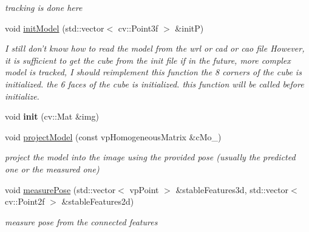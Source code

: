 \begin{DoxyCompactItemize}
\begin{DoxyCompactList}\small\item\em tracking is done here \end{DoxyCompactList}\item 
void \hyperlink{classkltFbTracker_aa830b7fcfceaa9bfccb77c7eab879ff8}{init\-Model} (std\-::vector$<$ cv\-::\-Point3f $>$ \&init\-P)
\begin{DoxyCompactList}\small\item\em \-I still don't know how to read the model from the wrl or cad or cao file \-However, it is sufficient to get the cube from the init file if in the future, more complex model is tracked, \-I should reimplement this function the 8 corners of the cube is initialized. the 6 faces of the cube is initialized. this function will be called before initialize. \end{DoxyCompactList}\item 
\hypertarget{classkltFbTracker_abb7ffa568c30b0f5760fa567abe69505}{void {\bfseries init} (cv\-::\-Mat \&img)}\label{classkltFbTracker_abb7ffa568c30b0f5760fa567abe69505}

\item 
void \hyperlink{classkltFbTracker_af63e4b7bfd2dabdf681a345a08a6a6ce}{project\-Model} (const vp\-Homogeneous\-Matrix \&c\-Mo\-\_\-)
\begin{DoxyCompactList}\small\item\em project the model into the image using the provided pose (usually the predicted one or the measured one) \end{DoxyCompactList}\item 
void \hyperlink{classkltFbTracker_a807b39de5e5d5a6b9dcf14b8efa09f70}{measure\-Pose} (std\-::vector$<$ vp\-Point $>$ \&stable\-Features3d, std\-::vector$<$ cv\-::\-Point2f $>$ \&stable\-Features2d)
\begin{DoxyCompactList}\small\item\em measure pose from the connected features \end{DoxyCompactList}\end{DoxyCompactItemize}
